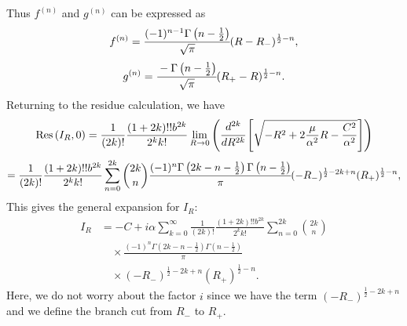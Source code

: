 \documentclass[12pt,oneside]{report}
\theoremstyle{definition}
\begin{document}
Thus $f^{(n)}$ and $g^{(n)}$ can be expressed as
$$f^{(n)} = \cfrac{(-1)^{n-1}\Gamma\left(n -\frac{1}{2}\right)}{\sqrt{\pi}}(R-R_{-})^{\frac{1}{2}-n},$$
$$g^{(n)} = \cfrac{-\Gamma\left(n -\frac{1}{2}\right)}{\sqrt{\pi}}(R_{+}-R)^{\frac{1}{2}-n}.$$
Returning to the residue calculation, we have
$$\text{Res}\left(I_{R},0\right) = \frac{1}{(2k)!}\frac{(1+2k)!!b^{2k}}{2^{k}k!}\lim_{R\rightarrow0} \left( \cfrac{d^{2k}}{dR^{2k}} \left[ {\sqrt{-R^{2}+2\frac{\mu}{\alpha^{2}} R -\frac{C^{2}}{\alpha^{2}}}} \right] \right) $$
$$ = \frac{1}{(2k)!}\frac{(1+2k)!!b^{2k}}{2^{k}k!} \sum_{n=0}^{2k}\binom{2k}{n}\cfrac{(-1)^{n}\Gamma\left(2k-n-\frac{1}{2}\right)\Gamma\left(n-\frac{1}{2}\right)}{\pi}(-R_{-})^{\frac{1}{2}-2k+n}(R_{+})^{\frac{1}{2}-n},$$
This gives the general expansion for \(I_{R}\):
\begin{equation}
\begin{split}
I_{R} &= -C + i\alpha \sum_{k=0}^{\infty} \frac{1}{(2k)!} 
\frac{(1+2k)!!b^{2k}}{2^{k}k!}  
\sum_{n=0}^{2k} \binom{2k}{n} \\
&\quad \times \frac{(-1)^{n} \Gamma\left(2k-n-\frac{1}{2}\right) 
\Gamma\left(n-\frac{1}{2}\right)}{\pi} \\
&\quad \times (-R_{-})^{\frac{1}{2}-2k+n} 
(R_{+})^{\frac{1}{2}-n}.
\end{split}
\end{equation}
Here, we do not worry about the factor \(i\) since we have the term \((-R_{-})^{\frac{1}{2}-2k+n}\) and we define the branch cut from \(R_{-}\) to \(R_{+}\).
\end{document}
